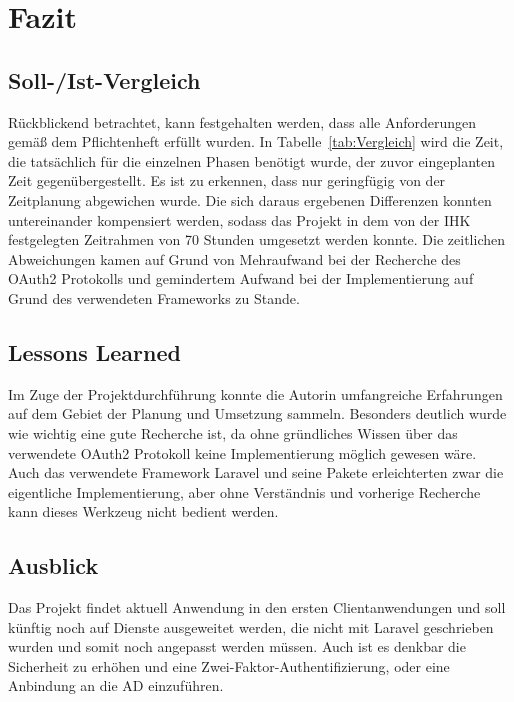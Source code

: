 \section{Fazit} 
\label{sec:Fazit}

\subsection{Soll-/Ist-Vergleich}
\label{sec:SollIstVergleich}
Rückblickend betrachtet, kann festgehalten werden, dass alle Anforderungen gemäß dem Pflichtenheft erfüllt wurden. 
In Tabelle~\ref{tab:Vergleich} wird die Zeit, die tatsächlich für die einzelnen Phasen benötigt wurde, der zuvor eingeplanten Zeit gegenübergestellt. 
Es ist zu erkennen, dass nur geringfügig von der Zeitplanung abgewichen wurde. Die sich daraus ergebenen Differenzen konnten untereinander kompensiert werden, sodass das Projekt in dem von der IHK festgelegten Zeitrahmen von 70 Stunden umgesetzt werden konnte.
Die zeitlichen Abweichungen kamen auf Grund von Mehraufwand bei der Recherche des OAuth2 Protokolls und gemindertem Aufwand bei der Implementierung auf Grund des verwendeten Frameworks zu Stande.

\subsection{Lessons Learned}
\label{sec:LessonsLearned}
Im Zuge der Projektdurchführung konnte die Autorin umfangreiche Erfahrungen auf dem Gebiet der Planung und Umsetzung sammeln.
Besonders deutlich wurde wie wichtig eine gute Recherche ist, da ohne gründliches Wissen über das verwendete OAuth2 Protokoll keine Implementierung möglich gewesen wäre.
Auch das verwendete Framework Laravel und seine Pakete erleichterten zwar die eigentliche Implementierung, aber ohne Verständnis und vorherige Recherche kann dieses Werkzeug nicht bedient werden. 
\subsection{Ausblick}
\label{sec:Ausblick}
Das Projekt findet aktuell Anwendung in den ersten Clientanwendungen und soll künftig noch auf Dienste ausgeweitet werden, die nicht mit Laravel geschrieben wurden und somit noch angepasst werden müssen. Auch ist es denkbar die Sicherheit zu erhöhen und eine Zwei-Faktor-Authentifizierung, oder eine Anbindung an die AD einzuführen.
